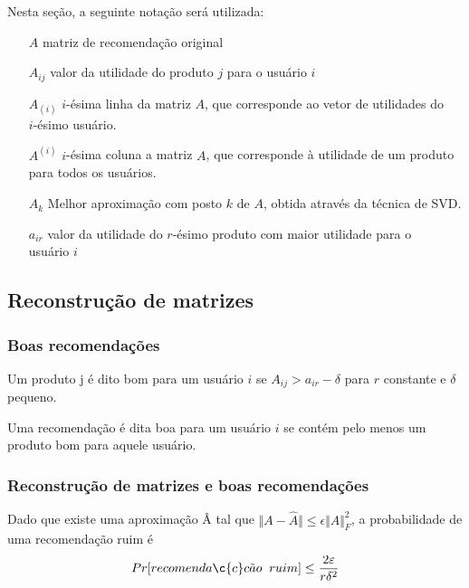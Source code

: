 \documentclass[a4paper,10pt]{article}
\begin{document}
Nesta seção, a seguinte notação será utilizada:

\begin{itemize}
\item[$A$] matriz de recomendação original
\item[$A_{ij}$] valor da utilidade do produto $j$ para o usuário $i$
\item[$A_{(i)}$] $i$-ésima linha da matriz $A$, que corresponde ao
vetor de utilidades do \\ $i$-ésimo usuário.
\item[$A^{(i)}$] $i$-ésima coluna a matriz $A$, que corresponde à 
utilidade de um produto para todos os usuários.
\item[$A_k$] Melhor aproximação com posto $k$ de $A$, obtida através da técnica de SVD.
\item[$a_{ir}$] valor da utilidade do $r$-ésimo produto com maior utilidade
para o \\ usuário $i$ 
\end{itemize}

\subsection{Reconstrução de matrizes}

\subsubsection{Boas recomendações}
\begin{definicao} \label{definicao:box} Um produto j é dito bom para um
usuário $i$ se $A_{ij} > a_{ir} - \delta$ para $r$ constante e $\delta$ pequeno.
\end{definicao}
\begin{definicao} \label{definicao:box}Uma recomendação é dita boa para um usuário
$i$ se contém pelo menos um produto bom para aquele usuário.
\end{definicao}

\subsubsection{Reconstrução de matrizes e boas recomendações}

\begin{lema} \label{lema:box}
Dado que existe uma aproximação Â tal que $\Vert A - \hat{A} \Vert \le \epsilon \Vert A
\Vert^2_F$, a probabilidade de uma recomenda\c{c}\~ao
ruim é 
\begin{equation}
Pr [ recomenda \c{c}c \tilde ao \;\; ruim ] \leq \frac{2\varepsilon}{r\delta^2}
\end{equation} 

\end{lema}
\end{document}
